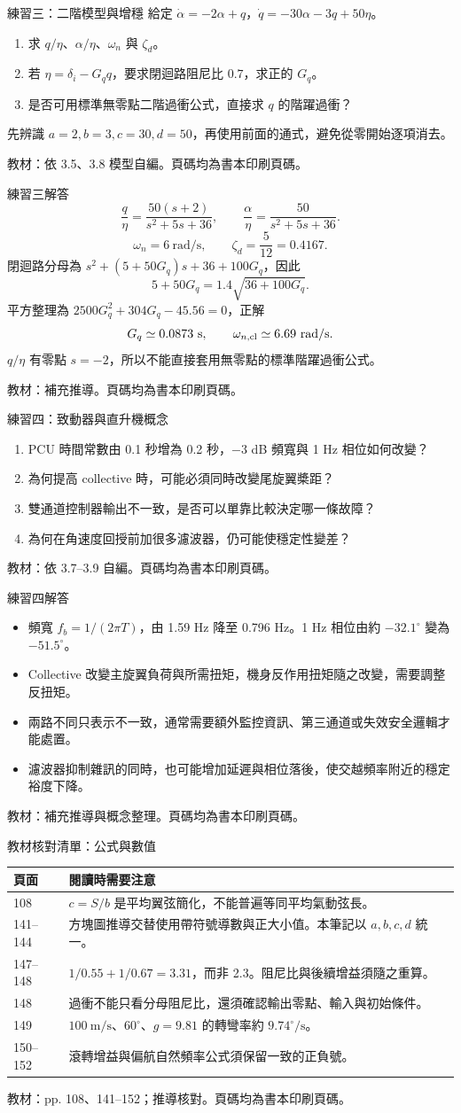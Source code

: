 \documentclass[aspectratio=169,11pt]{beamer}
\newcommand{\src}[1]{\par\vfill{\scriptsize\color{teal}教材：#1。頁碼均為書本印刷頁碼。}}
\newcommand{\slide}[3]{\begin{frame}[t]{#1}#3\src{#2}\end{frame}}
\newcommand{\bi}{\begin{itemize}\setlength{\itemsep}{5pt}}
\newcommand{\ei}{\end{itemize}}
\newcommand{\key}[1]{\par\medskip{\color{teal}\bfseries #1}\par\smallskip}
\begin{document}
\slide{練習三：二階模型與增穩}{依 3.5、3.8 模型自編}{
給定 $\dot\alpha=-2\alpha+q$，$\dot q=-30\alpha-3q+50\eta$。
\begin{enumerate}\setlength{\itemsep}{8pt}
\item 求 $q/\eta$、$\alpha/\eta$、$\omega_n$ 與 $\zeta_d$。
\item 若 $\eta=\delta_i-G_qq$，要求閉迴路阻尼比 $0.7$，求正的 $G_q$。
\item 是否可用標準無零點二階過衝公式，直接求 $q$ 的階躍過衝？
\end{enumerate}
\key{提示}先辨識 $a=2,b=3,c=30,d=50$，再使用前面的通式，避免從零開始逐項消去。
}
\slide{練習三解答}{補充推導}{
\small
\[
\frac q\eta=\frac{50(s+2)}{s^2+5s+36},\qquad
\frac\alpha\eta=\frac{50}{s^2+5s+36}.
\]
\[
\omega_n=6\ \mathrm{rad/s},\qquad\zeta_d=\frac5{12}=0.4167.
\]
閉迴路分母為 $s^2+(5+50G_q)s+36+100G_q$，因此
\[
5+50G_q=1.4\sqrt{36+100G_q}.
\]
平方整理為 $2500G_q^2+304G_q-45.56=0$，正解
\[
G_q\simeq0.0873\ \mathrm{s},\qquad \omega_{n,\rm cl}\simeq6.69\ \mathrm{rad/s}.
\]
$q/\eta$ 有零點 $s=-2$，所以不能直接套用無零點的標準階躍過衝公式。
}
\slide{練習四：致動器與直升機概念}{依 3.7--3.9 自編}{
\begin{enumerate}\setlength{\itemsep}{8pt}
\item PCU 時間常數由 0.1 秒增為 0.2 秒，$-3$ dB 頻寬與 1 Hz 相位如何改變？
\item 為何提高 collective 時，可能必須同時改變尾旋翼槳距？
\item 雙通道控制器輸出不一致，是否可以單靠比較決定哪一條故障？
\item 為何在角速度回授前加很多濾波器，仍可能使穩定性變差？
\end{enumerate}
}
\slide{練習四解答}{補充推導與概念整理}{
\bi
\item 頻寬 $f_b=1/(2\pi T)$，由 1.59 Hz 降至 0.796 Hz。1 Hz 相位由約 $-32.1^\circ$ 變為 $-51.5^\circ$。
\item Collective 改變主旋翼負荷與所需扭矩，機身反作用扭矩隨之改變，需要調整反扭矩。
\item 兩路不同只表示不一致，通常需要額外監控資訊、第三通道或失效安全邏輯才能處置。
\item 濾波器抑制雜訊的同時，也可能增加延遲與相位落後，使交越頻率附近的穩定裕度下降。
\ei
}
\slide{教材核對清單：公式與數值}{pp. 108、141--152；推導核對}{
\small
\begin{tabular}{p{.13\textwidth}p{.72\textwidth}}
\toprule 頁面 & 閱讀時需要注意\\\midrule
108 & $c=S/b$ 是平均翼弦簡化，不能普遍等同平均氣動弦長。\\
141--144 & 方塊圖推導交替使用帶符號導數與正大小值。本筆記以 $a,b,c,d$ 統一。\\
147--148 & $1/0.55+1/0.67=3.31$，而非 2.3。阻尼比與後續增益須隨之重算。\\
148 & 過衝不能只看分母阻尼比，還須確認輸出零點、輸入與初始條件。\\
149 & $100\ \mathrm{m/s}$、$60^\circ$、$g=9.81$ 的轉彎率約 $9.74^\circ/\mathrm{s}$。\\
150--152 & 滾轉增益與偏航自然頻率公式須保留一致的正負號。\\\bottomrule
\end{tabular}
}
\end{document}
